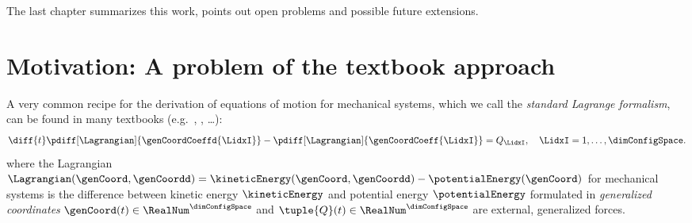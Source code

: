 The last chapter summarizes this work, points out open problems and possible future extensions.


\section{Motivation: A problem of the textbook approach}\label{sec:AnaMechMotivation}
A very common recipe for the derivation of equations of motion for mechanical systems, which we call the \textit{standard Lagrange formalism}, can be found in many textbooks (e.g.\ \cite[sec.\ 4.2]{Murray:Robotic}, \cite[§5]{Landau:Mechanics}, \ldots):
% 
\begin{align}\label{eq:LagrangeEq}
 \diff{t} \pdiff[\Lagrangian]{\genCoordCoeffd{\LidxI}} - \pdiff[\Lagrangian]{\genCoordCoeff{\LidxI}} = Q_{\LidxI}, \quad \LidxI = 1,\ldots,\dimConfigSpace.
\end{align}
where the Lagrangian $\Lagrangian(\genCoord, \genCoordd) = \kineticEnergy(\genCoord, \genCoordd) - \potentialEnergy(\genCoord)$ for mechanical systems is the difference between kinetic energy $\kineticEnergy$ and potential energy $\potentialEnergy$ formulated in \textit{generalized coordinates} $\genCoord(t) \in \RealNum^{\dimConfigSpace}$ and $\tuple{Q}(t) \in \RealNum^{\dimConfigSpace}$ are external, generalized forces.

